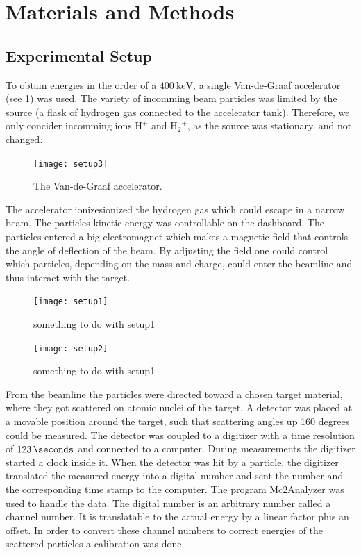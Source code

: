 \section{Materials and Methods}
\subsection{Experimental Setup}
To obtain energies in the order of a $\SI{400}{\kilo\electronvolt}$, a single Van-de-Graaf
accelerator (see \cref{fig_setup3}) was used. The variety of incomming beam particles
was limited by the source (a flask of hydrogen gas connected to the accelerator
tank). Therefore, we only concider incomming ions $\mathrm{H^+}$ and
$\mathrm{{H_{2}}^{+}}$, as the source was stationary, and not changed.\\

\begin{figure}[t]
    \centering
    \texttt{[image: setup3]}
    \caption{The Van-de-Graaf accelerator.}
    \label{fig_setup3}
\end{figure}


The accelerator ionizesionized the hydrogen gas which could escape in a narrow beam.
The particles kinetic energy was controllable on the dashboard. The particles entered a big electromagnet which makes a magnetic field that controls the angle of deflection of the beam. By adjusting the field one could control which particles, depending on the mass and charge, could enter the beamline and thus interact with the target. 
\begin{figure}[h!]
    \centering
    \texttt{[image: setup1]}
    \caption{something to do with setup1}
    \label{fig_setup1}
\end{figure}

\begin{figure}[h!]
    \centering
    \texttt{[image: setup2]}
    \caption{something to do with setup1}
    \label{fig_setup2}
\end{figure}




From the beamline the particles were directed toward a chosen target material, where they got scattered on atomic nuclei of the target. A detector was placed at a movable position around the target, such that scattering angles up 160 degrees could be measured. 
The detector was coupled to a digitizer with a time resolution of
$\SI{123}{\seconds}$  and  connected to a computer. During measurements the digitizer started a clock inside it. When the detector was hit by a particle, the digitizer translated the measured energy into a digital number and sent the number and the corresponding time stamp to the computer. 
The program Mc2Analyzer was used to handle the data. The digital number is an arbitrary number called a channel number. It is translatable to the actual energy by a linear factor plus an offset. In order to convert these channel numbers to correct energies of the scattered particles a calibration was done.


